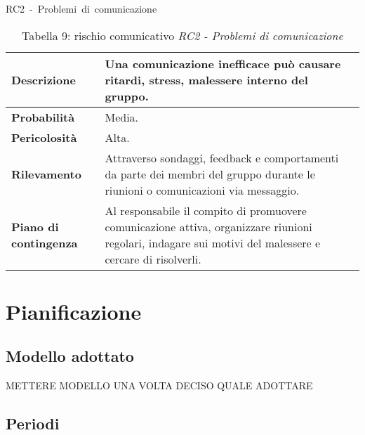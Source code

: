 \documentclass[italian,12pt]{article} %
\begin{document}
\begin{table}[!h]
    \centering
    \hbox{RC2 - Problemi di comunicazione }
    \vspace{0.3cm}
	\begin{tabular}{|l|p{10cm}|} 
		\hline
		\textbf{Descrizione} & Una comunicazione inefficace può causare ritardi, stress, malessere interno del gruppo.  \\ 
        \hline
        \textbf{Probabilità} & Media. \\
        \hline
        \textbf{Pericolosità} & Alta. \\
        \hline
        \textbf{Rilevamento} & Attraverso sondaggi, feedback e comportamenti da parte dei membri del gruppo durante le riunioni o comunicazioni via messaggio. \\
        \hline
        \textbf{Piano di contingenza} & Al responsabile il compito di promuovere comunicazione attiva, organizzare riunioni regolari, indagare sui motivi del malessere e cercare di risolverli. \\
		\hline
	\end{tabular}
    \caption{Tabella 9: rischio comunicativo \textit{RC2 - Problemi di comunicazione}}
\end{table}


\newpage
\newblock\newpage
\newblock\newpage
\newblock\newpage
\newblock\newpage
\newblock
\section{Pianificazione}
\subsection{Modello adottato}

METTERE MODELLO UNA VOLTA DECISO QUALE ADOTTARE
\subsection{Periodi}
\end{document}
